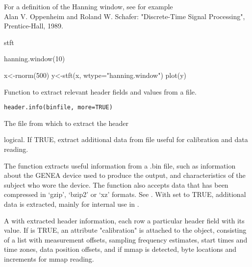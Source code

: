 \documentclass[a4paper]{book}
\begin{document}
%
\begin{References}\relax
For a definition of the Hanning window, see for example\\{}
Alan V. Oppenheim and Roland W. Schafer: "Discrete-Time Signal
Processing", Prentice-Hall, 1989.
\end{References}
%
\begin{SeeAlso}\relax
stft
\end{SeeAlso}
%
\begin{Examples}
\begin{ExampleCode}
hanning.window(10)

x<-rnorm(500)
y<-stft(x, wtype="hanning.window")
plot(y)
\end{ExampleCode}
\end{Examples}
%
\begin{Description}\relax
Function to extract relevant header fields and values from a file.
\end{Description}
%
\begin{Usage}
\begin{verbatim}
header.info(binfile, more=TRUE)
\end{verbatim}
\end{Usage}
%
\begin{Arguments}
\begin{ldescription}
\item[\code{binfile}] The file from which to extract the header
\item[\code{more}] logical. If TRUE, extract additional data from file useful for calibration and data reading.
\end{ldescription}
\end{Arguments}
%
\begin{Details}\relax
The function extracts useful information from a .bin file, such as information about the GENEA device used to produce the output, and characteristics of the subject who wore the device. The function also accepts data that has been compressed in `gzip', `bzip2' or `xz' formats. See .
With  set to TRUE, additional data is extracted, mainly for internal use in .
\end{Details}
%
\begin{Value}
A  with extracted header information, each row a particular header field with its value. 
If  is TRUE, an attribute "calibration" is attached to the object, consisting of a list with measurement offsets, sampling frequency estimates, start times and time zones, data position offsets, and if mmap is detected, byte locations and increments for mmap reading.
\end{Value}
\end{document}
